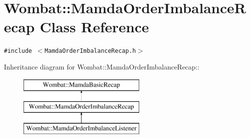 \hypertarget{classWombat_1_1MamdaOrderImbalanceRecap}{
\section{Wombat::Mamda\-Order\-Imbalance\-Recap Class Reference}
\label{classWombat_1_1MamdaOrderImbalanceRecap}
}
{\tt \#include $<$Mamda\-Order\-Imbalance\-Recap.h$>$}

Inheritance diagram for Wombat::Mamda\-Order\-Imbalance\-Recap::\begin{figure}[H]
\begin{center}
\leavevmode
\includegraphics[height=3cm]{classWombat_1_1MamdaOrderImbalanceRecap}
\end{center}
\end{figure}
